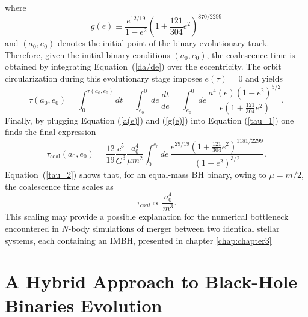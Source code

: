 \documentclass[12pt,twoside,openany]{book}
\begin{document}
where
\begin{equation}
\label{g(e)}
g(e)
\equiv
\frac{e^{12/19}}{1-e^2}
\left(1+\frac{121}{304}e^2\right)^{870/2299}
\end{equation}
and $(a_0,e_0)$ denotes the initial point of the binary evolutionary track. Therefore, given the initial binary conditions $(a_0,e_0)$, the coalescence time is obtained by integrating Equation~(\ref{da/de}) over the eccentricity. The orbit circularization during this evolutionary stage imposes $e(\tau)=0$ and yields
\begin{equation}
\tau(a_0,e_0)
=
\int_0^{\tau(a_0,e_0)}dt
=
\int_{e_0}^{0}de\,\frac{dt}{de}
=
\int_{e_0}^{0}de\,
\frac{a^4(e)(1-e^2)^{5/2}}
{e\left(1+\frac{121}{304}e^2\right)}.
\label{tau_1}
\end{equation}
Finally, by plugging Equation (\ref{a(e)}) and (\ref{g(e)}) into Equation (\ref{tau_1}) one finds the final expression
\begin{equation}
\tau_{\mathrm{coal}}(a_0,e_0)
=
\frac{12}{19}
\frac{c^5}{G^3}
\frac{a_0^4}{\mu m^2}
\int_0^{e_0}de\,
\frac{
e^{29/19}
\left(1+\frac{121}{304}e^2\right)^{1181/2299}
}
{(1-e^2)^{3/2}}.
\label{tau_2}
\end{equation}
Equation~(\ref{tau_2}) shows that, for an equal-mass BH binary, owing to $\mu=m/2$, the coalescence time scales as
\begin{equation}
 \tau_{coal}\propto \frac{a_0^4}{m^3}.
 \label{ketju scaling}
\end{equation}
This scaling may provide a possible explanation for the numerical bottleneck encountered in $N$-body simulations of merger between two identical stellar systems, each containing an IMBH, presented in chapter \ref{chap:chapter3}











\chapter{A Hybrid Approach to Black-Hole Binaries Evolution}\label{chap:chapter2}






\vspace*{\fill}
\end{document}
